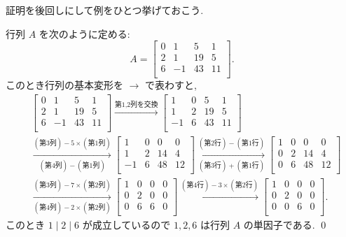 \documentclass[12pt,twoside]{jarticle}
\begin{document}
証明を後回しにして例をひとつ挙げておこう.

\begin{example}
\label{example:1}
 行列 $A$ を次のように定める:
 \begin{equation*}
  A =
  \begin{bmatrix}
    0 &  1 &  5 &  1 \\
    2 &  1 & 19 &  5 \\
    6 & -1 & 43 & 11 \\
  \end{bmatrix}.
 \end{equation*}
 このとき行列の基本変形を $\rightarrow$ で表わすと,
 \begin{align*}
  &
  \begin{bmatrix}
    0 &  1 &  5 &  1 \\
    2 &  1 & 19 &  5 \\
    6 & -1 & 43 & 11 \\
  \end{bmatrix}
  \xrightarrow{\text{第1,2列を交換}}
  \begin{bmatrix}
     1 & 0 &  5 &  1 \\
     1 & 2 & 19 &  5 \\
    -1 & 6 & 43 & 11 \\
  \end{bmatrix}
  \\ &
  \xrightarrow[(\text{第4列})-(\text{第1列})]{(\text{第3列})-5\times(\text{第1列})}
  \begin{bmatrix}
     1 & 0 &  0 &  0 \\
     1 & 2 & 14 &  4 \\
    -1 & 6 & 48 & 12 \\
  \end{bmatrix}
  \xrightarrow[(\text{第3行})+(\text{第1行})]{(\text{第2行})-(\text{第1行})}
  \begin{bmatrix}
    1 & 0 &  0 &  0 \\
    0 & 2 & 14 &  4 \\
    0 & 6 & 48 & 12 \\
  \end{bmatrix}
  \\ &
  \xrightarrow[(\text{第4列})-2\times(\text{第2列})]{(\text{第3列})-7\times(\text{第2列})}
  \begin{bmatrix}
    1 & 0 & 0 & 0 \\
    0 & 2 & 0 & 0 \\
    0 & 6 & 6 & 0 \\
  \end{bmatrix}
  \xrightarrow{(\text{第4行})-3\times(\text{第2行})}
  \begin{bmatrix}
    1 & 0 & 0 & 0 \\
    0 & 2 & 0 & 0 \\
    0 & 0 & 6 & 0 \\
  \end{bmatrix}.
 \end{align*}
 このとき $1\mid 2\mid 6$ が成立しているので $1,2,6$ は行列 $A$ の単因子である.
 \qed
\end{example}
\end{document}
